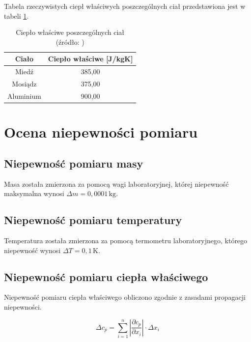 \documentclass[a4paper,12pt]{article}
\begin{document}
Tabela rzeczywistych ciepł właściwych poszczególnych ciał przedstawiona jest w tabeli \ref{tab:cieplo_wlasciwe_rzeczywiste}.

\begin{table}[H]
    \centering
    \begin{tabular}{|c|c|}
        \hline
        \textbf{Ciało} & \textbf{Ciepło właściwe [J/kgK]} \\
        \hline
        Miedź & 385{,}00 \\
        \hline
        Mosiądz & 375{,}00 \\
        \hline
        Aluminium & 900{,}00 \\
        \hline
    \end{tabular}
    \caption{Ciepło właściwe poszczególnych ciał (źródło: \cite{cieplo_wlasciwe_tabele})}
    \label{tab:cieplo_wlasciwe_rzeczywiste}
\end{table}




\section{Ocena niepewności pomiaru}

\subsection{Niepewność pomiaru masy}

Masa została zmierzona za pomocą wagi laboratoryjnej, której niepewność maksymalna wynosi $\Delta m = 0{,}0001\,\text{kg}$.

\subsection{Niepewność pomiaru temperatury}

Temperatura została zmierzona za pomocą termometru laboratoryjnego, którego niepewność wynosi $\Delta T = 0{,}1\,\text{K}$.

\subsection{Niepewność pomiaru ciepła właściwego}

Niepewność pomiaru ciepła właściwego obliczono zgodnie z zasadami propagacji niepewności.

\begin{equation}
    \Delta c_p = \sum_{i=1}^{n} \left | \frac{\partial c_p}{\partial x_i} \right | \cdot \Delta x_i
\end{equation}
\end{document}
